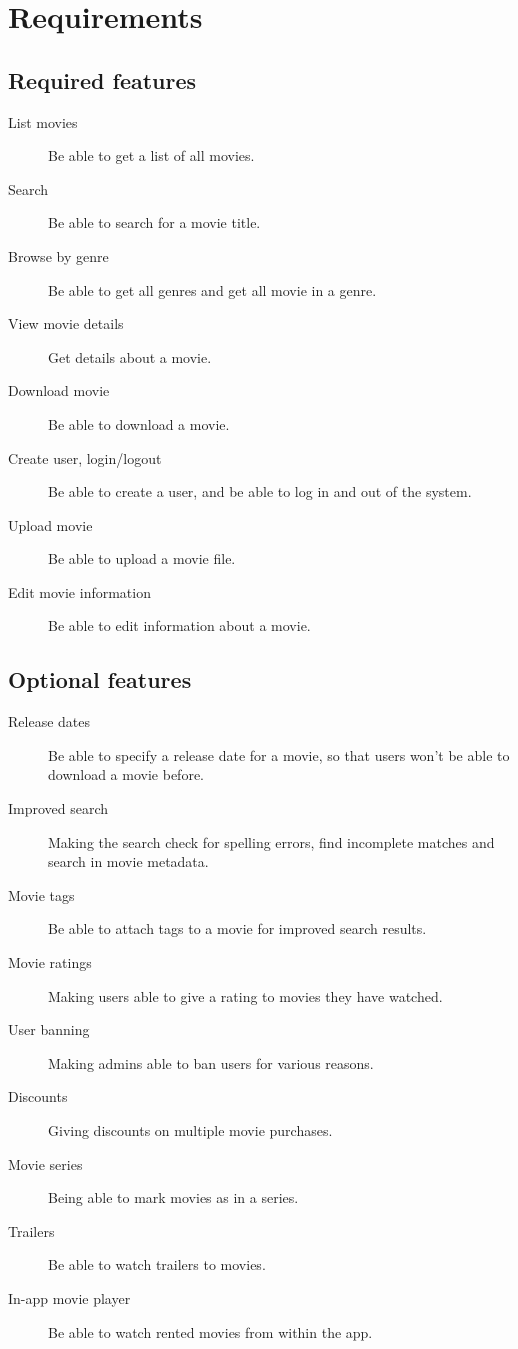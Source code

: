 \chapter{Requirements}
\label{Requirements}

\section{Required features}
\label{Requirements_Features}

\begin{description}
\item[List movies] Be able to get a list of all movies. 
\item[Search] Be able to search for a movie title. 
\item[Browse by genre] Be able to get all genres and get all movie in a genre. 
\item[View movie details] Get details about a movie. 
\item[Download movie] Be able to download a movie. 
\item[Create user, login/logout] Be able to create a user, and be able to log in and out of the system.
\item[Upload movie] Be able to upload a movie file. 
\item[Edit movie information] Be able to edit information about a movie. 
\end{description}

\section{Optional features}
\label{Requirements_Optional}

\begin{description}
\item[Release dates] Be able to specify a release date for a movie, so that users won't be able to download a movie before.
\item[Improved search] Making the search check for spelling errors, find incomplete matches and search in movie metadata.
\item[Movie tags] Be able to attach tags to a movie for improved search results.
\item[Movie ratings] Making users able to give a rating to movies they have watched.
\item[User banning] Making admins able to ban users for various reasons.
\item[Discounts] Giving discounts on multiple movie purchases.
\item[Movie series] Being able to mark movies as in a series.
\item[Trailers] Be able to watch trailers to movies.
\item[In-app movie player] Be able to watch rented movies from within the app.
\end{description}